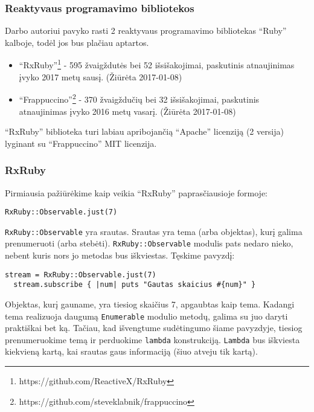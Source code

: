 \subsubsection{Reaktyvaus programavimo bibliotekos}

Darbo autoriui pavyko rasti 2 reaktyvaus programavimo bibliotekas ``Ruby'' kalboje, todėl jos bus plačiau aptartos.

\begin{itemize}
  \item ``RxRuby''\footnote{https://github.com/ReactiveX/RxRuby} - 595 žvaigždutės bei 52 išsišakojimai, paskutinis atnaujinimas įvyko 2017 metų sausį. (Žiūrėta 2017-01-08)

  \item ``Frappuccino''\footnote{https://github.com/steveklabnik/frappuccino} - 370 žvaigždučių bei 32 išsišakojimai, paskutinis atnaujinimas įvyko 2016 metų vasarį. (Žiūrėta 2017-01-08)
\end{itemize}

``RxRuby'' biblioteka turi labiau apribojančią ``Apache'' licenziją (2 versija) lyginant su ``Frappuccino'' MIT licenzija.

\subsubsection{RxRuby}

Pirmiausia pažiūrėkime kaip veikia ``RxRuby'' paprasčiausioje formoje:

\begin{lstlisting}[]
  RxRuby::Observable.just(7)
\end{lstlisting}

\lstinline|RxRuby::Observable| yra srautas. Srautas yra tema (arba objektas), kurį galima prenumeruoti (arba stebėti). \lstinline|RxRuby::Observable| modulis pats nedaro nieko, nebent kuris nors jo metodas bus iškviestas. Tęskime pavyzdį:

\begin{lstlisting}[]
  stream = RxRuby::Observable.just(7)
  stream.subscribe { |num| puts "Gautas skaicius #{num}" }
\end{lstlisting}

Objektas, kurį gauname, yra tiesiog skaičius 7, apgaubtas kaip tema. Kadangi tema realizuoja daugumą \lstinline|Enumerable| modulio metodų, galima su juo daryti praktiškai bet ką. Tačiau, kad išvengtume sudėtingumo šiame pavyzdyje, tiesiog prenumeruokime temą ir perduokime \lstinline|lambda| konstrukciją. \lstinline|Lambda| bus iškviesta kiekvieną kartą, kai srautas gaus informaciją (šiuo atveju tik kartą).

